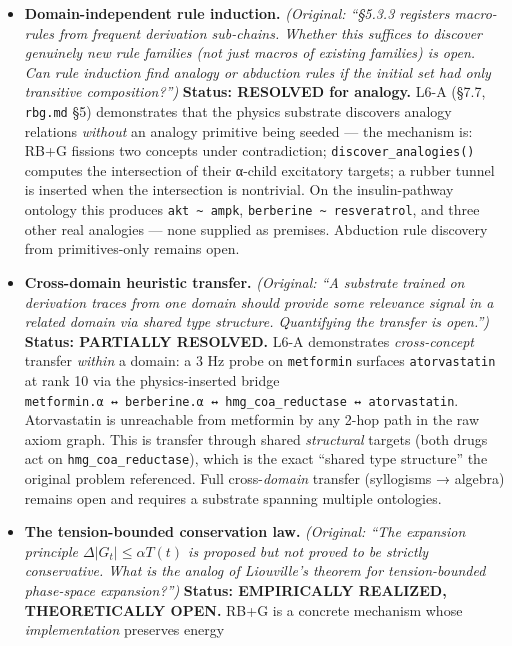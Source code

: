 \documentclass[
  11pt,
  a4paper,
]{article}
\begin{document}
\begin{itemize}
\item
  \textbf{Domain-independent rule induction.} \emph{(Original: ``§5.3.3
  registers macro-rules from frequent derivation sub-chains. Whether
  this suffices to discover genuinely new rule families (not just macros
  of existing families) is open. Can rule induction find analogy or
  abduction rules if the initial set had only transitive
  composition?'')} \textbf{Status: RESOLVED for analogy.} L6-A (§7.7,
  \texttt{rbg.md} §5) demonstrates that the physics substrate discovers
  analogy relations \emph{without} an analogy primitive being seeded ---
  the mechanism is: RB+G fissions two concepts under contradiction;
  \texttt{discover\_analogies()} computes the intersection of their
  α-child excitatory targets; a rubber tunnel is inserted when the
  intersection is nontrivial. On the insulin-pathway ontology this
  produces \texttt{akt\ \textasciitilde{}\ ampk},
  \texttt{berberine\ \textasciitilde{}\ resveratrol}, and three other
  real analogies --- none supplied as premises. Abduction rule discovery
  from primitives-only remains open.
\item
  \textbf{Cross-domain heuristic transfer.} \emph{(Original: ``A
  substrate trained on derivation traces from one domain should provide
  some relevance signal in a related domain via shared type structure.
  Quantifying the transfer is open.'')} \textbf{Status: PARTIALLY
  RESOLVED.} L6-A demonstrates \emph{cross-concept} transfer
  \emph{within} a domain: a 3 Hz probe on \texttt{metformin} surfaces
  \texttt{atorvastatin} at rank 10 via the physics-inserted bridge
  \texttt{metformin.α\ ↔\ berberine.α\ ↔\ hmg\_coa\_reductase\ ↔\ atorvastatin}.
  Atorvastatin is unreachable from metformin by any 2-hop path in the
  raw axiom graph. This is transfer through shared \emph{structural}
  targets (both drugs act on \texttt{hmg\_coa\_reductase}), which is the
  exact ``shared type structure'' the original problem referenced. Full
  cross-\emph{domain} transfer (syllogisms → algebra) remains open and
  requires a substrate spanning multiple ontologies.
\item
  \textbf{The tension-bounded conservation law.} \emph{(Original: ``The
  expansion principle \(\Delta|G_t| \leq \alpha T(t)\) is proposed but
  not proved to be strictly conservative. What is the analog of
  Liouville's theorem for tension-bounded phase-space expansion?'')}
  \textbf{Status: EMPIRICALLY REALIZED, THEORETICALLY OPEN.} RB+G is a
  concrete mechanism whose \emph{implementation} preserves energy

\end{itemize}
\end{document}
